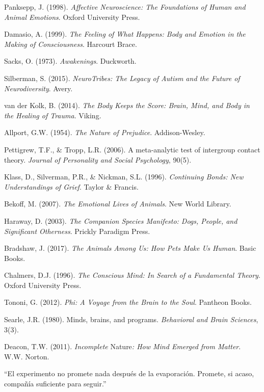  Panksepp, J. (1998). \emph{Affective Neuroscience: The Foundations of Human and Animal Emotions}. Oxford University Press.

 Damasio, A. (1999). \emph{The Feeling of What Happens: Body and Emotion in the Making of Consciousness}. Harcourt Brace.

 Sacks, O. (1973). \emph{Awakenings}. Duckworth.

 Silberman, S. (2015). \emph{NeuroTribes: The Legacy of Autism and the Future of Neurodiversity}. Avery.

 van der Kolk, B. (2014). \emph{The Body Keeps the Score: Brain, Mind, and Body in the Healing of Trauma}. Viking.

 Allport, G.W. (1954). \emph{The Nature of Prejudice}. Addison-Wesley.

 Pettigrew, T.F., \& Tropp, L.R. (2006). A meta-analytic test of intergroup contact theory. \emph{Journal of Personality and Social Psychology}, 90(5).

 Klass, D., Silverman, P.R., \& Nickman, S.L. (1996). \emph{Continuing Bonds: New Understandings of Grief}. Taylor \& Francis.

 Bekoff, M. (2007). \emph{The Emotional Lives of Animals}. New World Library.

 Haraway, D. (2003). \emph{The Companion Species Manifesto: Dogs, People, and Significant Otherness}. Prickly Paradigm Press.

 Bradshaw, J. (2017). \emph{The Animals Among Us: How Pets Make Us Human}. Basic Books.

 Chalmers, D.J. (1996). \emph{The Conscious Mind: In Search of a Fundamental Theory}. Oxford University Press.

 Tononi, G. (2012). \emph{Phi: A Voyage from the Brain to the Soul}. Pantheon Books.

 Searle, J.R. (1980). Minds, brains, and programs. \emph{Behavioral and Brain Sciences}, 3(3).

 Deacon, T.W. (2011). \emph{Incomplete} Nature\emph{: How Mind Emerged from Matter}. W.W. Norton.

\findelexperimento
\begin{cita}\centering
“El experimento no promete nada después de la evaporación. Promete, si acaso, compañía suficiente para seguir.”
\end{cita}
